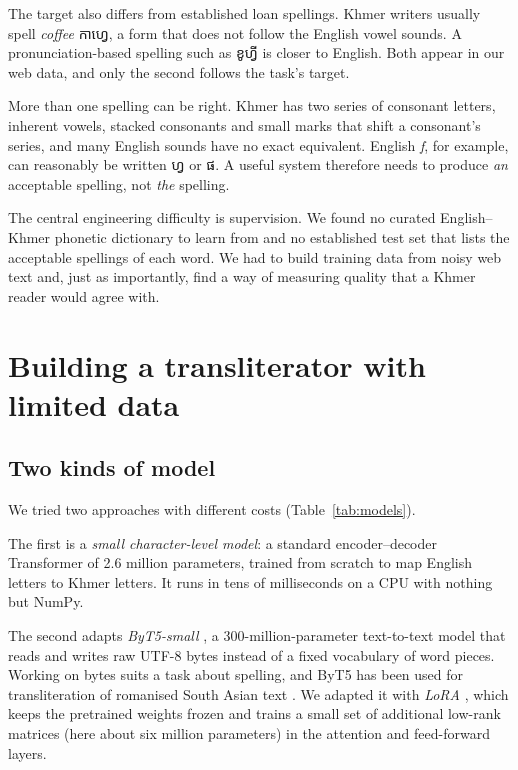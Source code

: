\documentclass[10pt,a4paper,twocolumn]{article}
\newcommand{\km}[1]{{\khmerfont #1}}
\begin{document}
The target also differs from established loan spellings. Khmer writers usually spell \emph{coffee} \km{កាហ្វេ},
a form that does not follow the English vowel sounds. A pronunciation-based spelling such as
\km{ខូហ្វី} is closer to English. Both appear in our web data, and only the second follows the task's target.

More than one spelling can be right. Khmer has two series of consonant letters, inherent vowels, stacked
consonants and small marks that shift a consonant's series, and many English sounds have no exact equivalent.
English \emph{f}, for example, can reasonably be written \km{ហ្វ} or \km{ផ}. A useful system therefore needs to
produce \emph{an} acceptable spelling, not \emph{the} spelling.

The central engineering difficulty is supervision. We found no curated English--Khmer phonetic dictionary to learn
from and no established test set that lists the acceptable spellings of each word. We had to build training data from noisy
web text and, just as importantly, find a way of measuring quality that a Khmer reader would agree with.

\section{Building a transliterator with limited data}
\label{sec:data}

\subsection{Two kinds of model}
We tried two approaches with different costs (Table~\ref{tab:models}).

The first is a \emph{small character-level model}: a standard encoder--decoder Transformer \citep{vaswani-etal-2017-attention} of 2.6 million
parameters, trained from scratch to map English letters to Khmer letters. It runs in tens of milliseconds on a CPU
with nothing but NumPy.

The second adapts \emph{ByT5-small} \citep{xue-etal-2022-byt5}, a 300-million-parameter text-to-text model that
reads and writes raw UTF-8 bytes instead of a fixed vocabulary of word pieces. Working on bytes suits a task about
spelling, and ByT5 has been used for transliteration of romanised South Asian text \citep{kirov-etal-2024-context}.
We adapted it with \emph{LoRA} \citep{hu-etal-2022-lora}, which keeps the pretrained weights frozen and trains a
small set of additional low-rank matrices (here about six million parameters) in the attention and feed-forward
layers.
\end{document}
